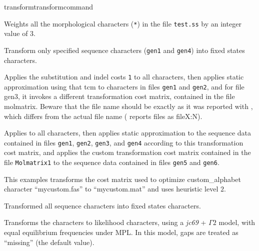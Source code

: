 \begin{command}{transform}{transformcommand}
\begin{poyexamples}


{Weights all the morphological characters (\texttt{*}) in the file \texttt{test.ss} by an
integer value of 3.}

{Transform only specified sequence characters (\texttt{gen1} and
\texttt{gen4}) into fixed states characters.}

{Applies the substitution and indel costs \texttt{1} to all characters, then applies static approximation
using that tcm to characters in files \texttt{gen1} and \texttt{gen2}, and for file
gen3, it invokes a different transformation cost matrix, contained
in the file molmatrix. Beware that the file name should be exactly
as it was reported with , which differs from the actual
file name ( reports files as fileX:N).}

{Applies  to all characters, then applies
static approximation to the sequence data contained in files \texttt{gen1}, \texttt{gen2},
\texttt{gen3}, and \texttt{gen4} according to this transformation cost
matrix, and applies the custom transformation cost matrix contained in the file
\texttt{Molmatrix1} to the sequence data contained in files \texttt{gen5} and
\texttt{gen6}.}

{This examples transforms the cost matrix used to optimize custom\_alphabet 
character ``mycustom.fas'' to ``mycustom.mat'' and uses heuristic level $2$.}

{Transformed all sequence characters into fixed states characters.}

{Transforms the characters to likelihood characters, using a \emph{jc69} + $\Gamma 2$ model, 
with equal equilibrium frequencies under MPL. In this model, gaps are treated as ``missing'' (the default value).}


\end{poyexamples}
\end{command}
